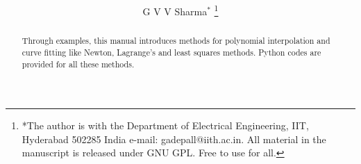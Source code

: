 \documentclass[journal,12pt,twocolumn]{IEEEtran}
\begin{document}
\let\StandardTheFigure\thefigure
\renewcommand{\thefigure}{\theproblem}



\def\putbox#1#2#3{\makebox[0in][l]{\makebox[#1][l]{}\raisebox{\baselineskip}[0in][0in]{\raisebox{#2}[0in][0in]{#3}}}}
     \def\rightbox#1{\makebox[0in][r]{#1}}
     \def\centbox#1{\makebox[0in]{#1}}
     \def\topbox#1{\raisebox{-\baselineskip}[0in][0in]{#1}}
     \def\midbox#1{\raisebox{-0.5\baselineskip}[0in][0in]{#1}}

\vspace{3cm}

\title{ 
}

\author{G V V Sharma$^{*}$ %
\thanks{*The author is with the Department
of Electrical Engineering, IIT, Hyderabad
502285 India e-mail: gadepall@iith.ac.in. All material in the manuscript is released under GNU GPL.  Free to use for all.}%
}



\maketitle




\IEEEpeerreviewmaketitle

\bigskip

\begin{abstract}
Through examples, this manual introduces methods for polynomial interpolation and curve fitting like Newton, Lagrange's and
least squares methods. 
Python codes are provided for all these methods.
\end{abstract}
%
\end{document}
